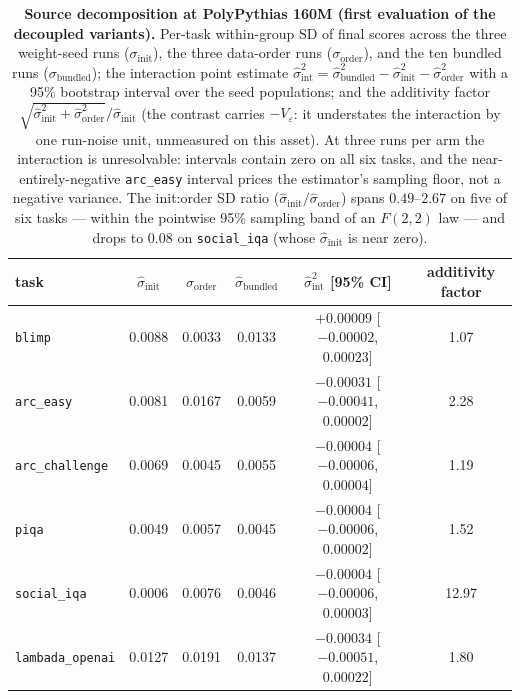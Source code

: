 \begin{table}[!htbp]
\centering
\caption{\textbf{Source decomposition at PolyPythias 160M (first evaluation of the decoupled
variants).} Per-task within-group SD of final scores across the three weight-seed runs
($\sigma_{\mathrm{init}}$), the three data-order runs ($\sigma_{\mathrm{order}}$), and the ten
bundled runs ($\sigma_{\mathrm{bundled}}$); the interaction point estimate
$\hat\sigma^2_{\mathrm{int}} = \hat\sigma^2_{\mathrm{bundled}} - \hat\sigma^2_{\mathrm{init}} -
\hat\sigma^2_{\mathrm{order}}$ with a 95\% bootstrap interval over the seed populations; and the
additivity factor $\sqrt{\hat\sigma^2_{\mathrm{init}} + \hat\sigma^2_{\mathrm{order}}} /
\hat\sigma_{\mathrm{init}}$ (the contrast carries $-V_\varepsilon$: it understates the interaction by one run-noise unit, unmeasured on this asset). At three runs per arm the interaction is unresolvable: intervals
contain zero on all six tasks, and the near-entirely-negative \texttt{arc\_easy} interval
prices the estimator's sampling floor, not a negative variance. The init:order SD ratio
($\hat\sigma_{\mathrm{init}}/\hat\sigma_{\mathrm{order}}$) spans $0.49$--$2.67$ on five of six
tasks --- within the pointwise 95\% sampling band of an $F(2,2)$ law --- and drops to $0.08$
on \texttt{social\_iqa} (whose $\hat\sigma_{\mathrm{init}}$ is near zero).}
\label{tab:pp160-decomp}
\footnotesize
\begin{tabular}{@{}lccccc@{}}
\toprule
task & $\hat\sigma_{\mathrm{init}}$ & $\hat\sigma_{\mathrm{order}}$ & $\hat\sigma_{\mathrm{bundled}}$
 & $\hat\sigma^2_{\mathrm{int}}$ [95\% CI] & additivity factor \\
\midrule
\texttt{blimp} & 0.0088 & 0.0033 & 0.0133 & $+0.00009$ [$-0.00002$, $0.00023$] & 1.07 \\
\texttt{arc\_easy} & 0.0081 & 0.0167 & 0.0059 & $-0.00031$ [$-0.00041$, $0.00002$] & 2.28 \\
\texttt{arc\_challenge} & 0.0069 & 0.0045 & 0.0055 & $-0.00004$ [$-0.00006$, $0.00004$] & 1.19 \\
\texttt{piqa} & 0.0049 & 0.0057 & 0.0045 & $-0.00004$ [$-0.00006$, $0.00002$] & 1.52 \\
\texttt{social\_iqa} & 0.0006 & 0.0076 & 0.0046 & $-0.00004$ [$-0.00006$, $0.00003$] & 12.97 \\
\texttt{lambada\_openai} & 0.0127 & 0.0191 & 0.0137 & $-0.00034$ [$-0.00051$, $0.00022$] & 1.80 \\
\bottomrule
\end{tabular}
\end{table}

